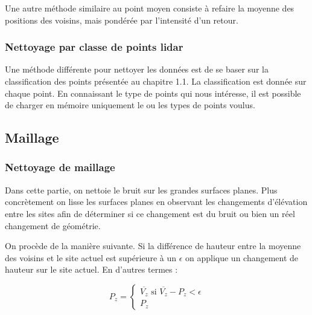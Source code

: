 Une autre méthode similaire au point moyen consiste à refaire la moyenne des
positions des voisins, mais pondérée par l'intensité d'un retour.

\subsubsection{Nettoyage par classe de points lidar}

Une méthode différente pour nettoyer les données est de se baser sur la 
classification des points présentée au chapitre 1.1.
La classification est donnée sur chaque point.
En connaissant le type de points qui nous intéresse, il est possible de charger
en mémoire uniquement le ou les types de points voulus. 

\subsection{Maillage}
\subsubsection{Nettoyage de maillage}

Dans cette partie, on nettoie le bruit sur les grandes surfaces planes.
Plus concrètement on lisse les surfaces planes en observant les changements
d'élévation entre les sites afin de déterminer si ce changement est du bruit ou
bien un réel changement de géométrie.

On procède de la manière suivante. 
Si la différence de hauteur entre la moyenne des voisins et le site actuel est
supérieure à un $\epsilon$ on applique un changement de hauteur sur le site
actuel.
En d'autres termes :

$$
P_z = 
\left \{
	\begin{array}{l}
		\overline{V_z}\text{ si } \overline{V_z} - P_z < \epsilon \\ 
		P_z 
	\end{array}
\right .
$$

